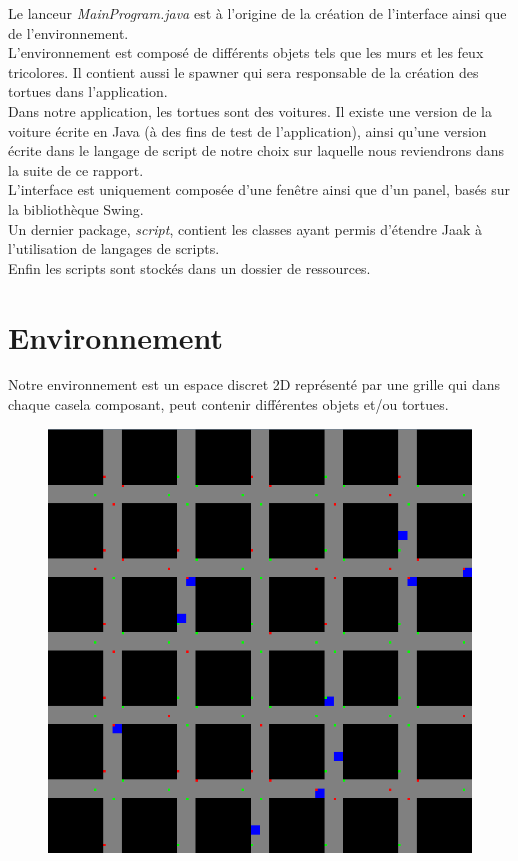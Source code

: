 \documentclass[a4paper,12pt]{report}
\begin{document}
Le lanceur \emph{MainProgram.java} est à l'origine de la création de l'interface ainsi que de l'environnement. \\

L'environnement est composé de différents objets tels que les murs et les feux tricolores. Il contient aussi le spawner qui sera responsable de la création des tortues dans l'application.\\

Dans notre application, les tortues sont des voitures. Il existe une version de la voiture écrite en Java (à des fins de test de l'application), ainsi qu'une version écrite dans le langage de script de notre choix sur laquelle nous reviendrons dans la suite de ce rapport. \\

L'interface est uniquement composée d'une fenêtre ainsi que d'un panel, basés sur la bibliothèque Swing. \\

Un dernier package, \emph{script}, contient les classes ayant permis d'étendre Jaak à l'utilisation de langages de scripts. \\

Enfin les scripts sont stockés dans un dossier de ressources.

\section{Environnement}

Notre environnement est un espace discret 2D représenté par une grille qui dans chaque casela composant, peut contenir différentes objets et/ou tortues. \\

\begin{figure}[H]
   \centering
   \includegraphics[scale=0.35]{environnement.png}
\end{figure}
\end{document}
